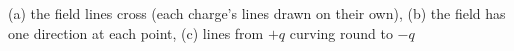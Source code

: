 (a) the field lines cross (each charge's lines drawn on their own), (b) the field has one direction at each point, (c) lines from $+q$ curving round to $-q$
